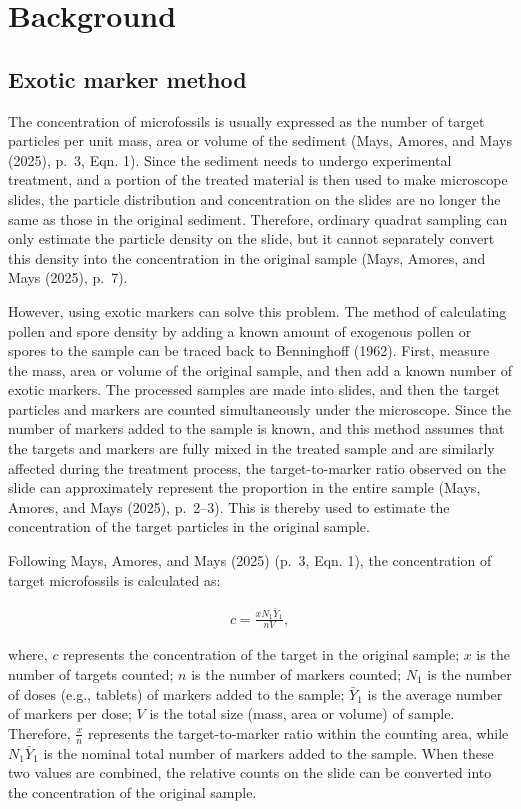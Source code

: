\documentclass[
  12pt,
]{article}
\begin{document}
\section{Background}\label{background}

\subsection{Exotic marker method}\label{exotic-marker-method}

The concentration of microfossils is usually expressed as the number of
target particles per unit mass, area or volume of the sediment (Mays,
Amores, and Mays (2025), p.~3, Eqn. 1). Since the sediment needs to
undergo experimental treatment, and a portion of the treated material is
then used to make microscope slides, the particle distribution and
concentration on the slides are no longer the same as those in the
original sediment. Therefore, ordinary quadrat sampling can only
estimate the particle density on the slide, but it cannot separately
convert this density into the concentration in the original sample
(Mays, Amores, and Mays (2025), p.~7).

However, using exotic markers can solve this problem. The method of
calculating pollen and spore density by adding a known amount of
exogenous pollen or spores to the sample can be traced back to
Benninghoff (1962). First, measure the mass, area or volume of the
original sample, and then add a known number of exotic markers. The
processed samples are made into slides, and then the target particles
and markers are counted simultaneously under the microscope. Since the
number of markers added to the sample is known, and this method assumes
that the targets and markers are fully mixed in the treated sample and
are similarly affected during the treatment process, the
target-to-marker ratio observed on the slide can approximately represent
the proportion in the entire sample (Mays, Amores, and Mays (2025),
p.~2--3). This is thereby used to estimate the concentration of the
target particles in the original sample.

Following Mays, Amores, and Mays (2025) (p.~3, Eqn. 1), the
concentration of target microfossils is calculated as:

\begin{align}
\label{eqn:c} c = \frac{xN_1\bar{Y}_1}{nV},
\end{align}

where, \(c\) represents the concentration of the target in the original
sample; \(x\) is the number of targets counted; \(n\) is the number of
markers counted; \(N_1\) is the number of doses (e.g., tablets) of
markers added to the sample; \(\bar{Y}_1\) is the average number of
markers per dose; \(V\) is the total size (mass, area or volume) of
sample. Therefore, \(\frac{x}{n}\) represents the target-to-marker ratio
within the counting area, while \(N_1\bar{Y}_1\) is the nominal total
number of markers added to the sample. When these two values are
combined, the relative counts on the slide can be converted into the
concentration of the original sample.
\end{document}
